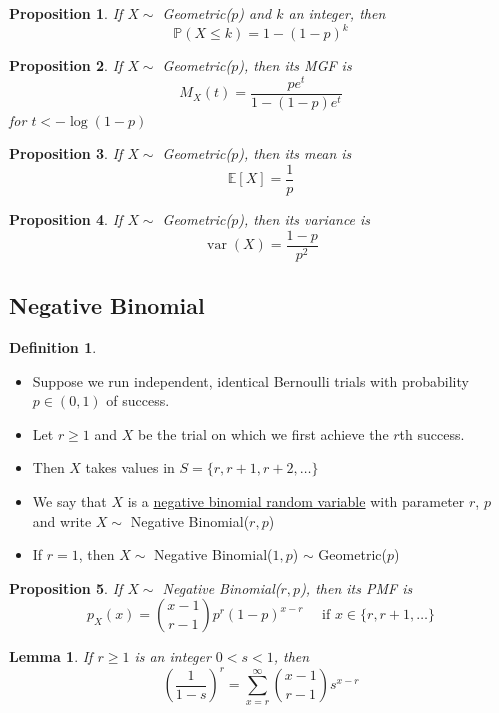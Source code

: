 \documentclass[
]{article}
\newtheorem{lemma}{Lemma}[section]
\newtheorem{proposition}{Proposition}[section]
\theoremstyle{definition}
\newtheorem{definition}{Definition}[section]
\theoremstyle{definition}
\theoremstyle{definition}
\theoremstyle{remark}
\newcommand{\prob}[1]{\mathbb{P}\left(#1\right)}
\newcommand{\pxx}{p_X(x)}
\newcommand{\mx}[1]{M_X(#1)}
\newcommand{\E}[1]{\mathbb{E}[#1]}
\newcommand{\varx}{\operatorname{var}(X)}
\begin{document}
\begin{proposition}
  If $X\sim$ Geometric($p$) and $k$ an integer, then
  \[\prob{X \leq k} = 1 - \left(1-p\right)^k \]
\end{proposition}

\begin{proposition}
  If $X\sim$ Geometric($p$), then its MGF is
  \[
    \mx{t} =\frac{pe^t}{1-(1-p)e^t}
  \]
  for $t<-\log(1-p)$
\end{proposition}

\begin{proposition}
  If $X\sim$ Geometric($p$), then its mean is
  \[\E{X}=\frac{1}{p}\]
\end{proposition}

\begin{proposition}
  If $X\sim$ Geometric($p$), then its variance is
  \[\varx=\frac{1-p}{p^2}\]
\end{proposition}

\subsection{Negative Binomial}

\begin{definition}
  \begin{itemize}
    \item Suppose we run independent, identical Bernoulli trials with probability $p\in(0,1)$ of success.
    \item Let $r\geq 1$ and $X$ be the trial on which we first achieve the $r$th success.
    \item Then $X$ takes values in $S=\{r,r+1,r+2,\dots\}$
    \item We say that $X$ is a \underline{negative binomial random variable} with parameter $r$, $p$ and write $X\sim$ Negative Binomial($r,p$)
    \item If $r=1$, then $X\sim$ Negative Binomial($1,p$) $\sim$ Geometric($p$)
  \end{itemize}
\end{definition}

\begin{proposition}
  If $X\sim$ Negative Binomial($r,p$), then its PMF is
  \[\pxx={x-1\choose r-1}p^r(1-p)^{x-r}\quad\text{ if }x\in\{r,r+1,\dots\}\]
\end{proposition}

\begin{lemma}
  If $r\geq1$ is an integer $0<s<1$, then
  \[\left(\frac{1}{1-s}\right)^r=\sum_{x=r}^\infty {x-1\choose r-1}s^{x-r}\]
\end{lemma}
\end{document}
